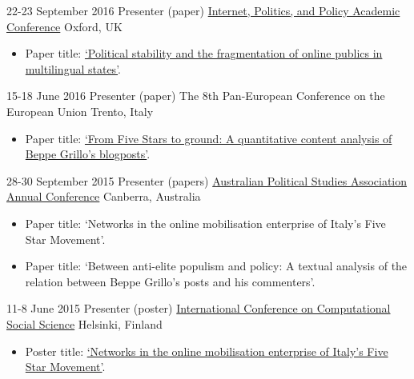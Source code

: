 \documentclass[11pt,a4paper,sans]{moderncv}
\begin{document}
    \cventry
        {22-23 September 2016} %
    {Presenter (paper)} %
    {\href{http://ipp.oii.ox.ac.uk/2016}{Internet, Politics, and Policy Academic Conference}} %
    {Oxford, UK} %
{}
    {
      \begin{itemize} %
        \item {Paper title: \href{http://ipp.oii.ox.ac.uk/2016/programme-2016/track-a-politics/participation-ii-networks-and/francesco-bailo-political-stability-and}{`Political stability and the fragmentation of online publics in multilingual states'}.}
      \end{itemize}
    }


    \cventry
        {15-18 June 2016} %
    {Presenter (paper)} %
    {The 8th Pan-European Conference on the European Union} %
    {Trento, Italy} %
{}
    {
      \begin{itemize} %
        \item {Paper title:  \href{http://ecpr.eu/Events/PaperDetails.aspx?PaperID=27234&amp;EventID=105}{`From Five Stars to ground: A quantitative content analysis of Beppe Grillo's blogposts'}.}
      \end{itemize}
    }

    \cventry
        {28-30 September 2015} %
    {Presenter (papers)} %
    {\href{http://www.auspsa.org.au/page/apsa-conference-2015-0}{Australian Political Studies Association Annual Conference}} %
    {Canberra, Australia} %
{}
    {
      \begin{itemize} %
        \item {Paper title: `Networks in the online mobilisation enterprise of Italy's Five Star Movement'.}
        \item {Paper title: `Between anti-elite populism and policy: A textual analysis of the relation between Beppe Grillo's posts and his commenters'.}
      \end{itemize}
    }

    \cventry
        {11-8 June 2015} %
    {Presenter (poster)} %
    {\href{http://www.iccss2015.eu/}{International Conference on Computational Social Science}} %
    {Helsinki, Finland} %
{}
    {
      \begin{itemize} %
        \item {Poster title:  \href{http://www.francescobailo.net/wordpress/wp-content/uploads/2016/04/f_bailo_poster_iccss15_original.pdf}{`Networks in the online mobilisation enterprise of Italy's Five Star Movement'}.}
      \end{itemize}
    }
\end{document}
